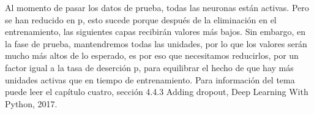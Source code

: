  Al momento de pasar los datos de prueba, todas las neuronas están activas. Pero se han reducido en p, esto sucede porque después de la eliminación en el entrenamiento, las siguientes capas recibirán valores más bajos. Sin embargo, en la fase de prueba, mantendremos todas las unidades, por lo que los valores serán mucho más altos de lo esperado, es por eso que necesitamos reducirlos, por un factor igual a la tasa de deserción p, para equilibrar el hecho de que hay más unidades activas que en tiempo de entrenamiento. Para información del tema puede leer el capítulo cuatro, sección 4.4.3 Adding dropout, Deep Learning With Python, 2017.  
 
 

